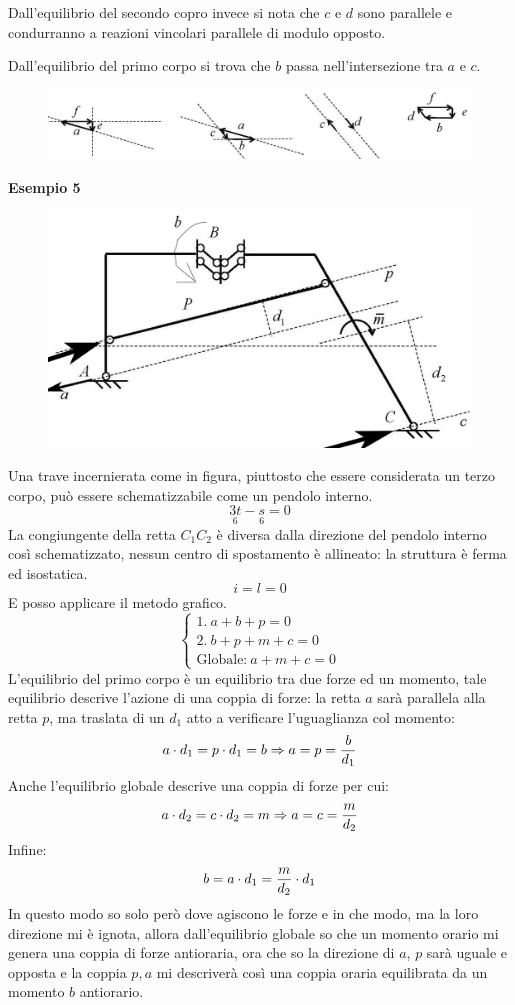 \documentclass{article}
\begin{document}
\begin{adjustwidth}{2in}{}
Dall'equilibrio del secondo copro invece si nota che $c$ e $d$ sono parallele e condurranno a reazioni vincolari parallele di modulo opposto. 

Dall'equilibrio del primo corpo si trova che $b$ passa nell'intersezione tra $a$ e $c$. 

\begin{figure}[H]
	\centering
	\includegraphics[width=0.6\linewidth]{immagini/1.PARTE4_Pagina_33}
\end{figure}
\newpage
\textbf{Esempio 5} \newline
\begin{figure}[H]
	\centering
	\includegraphics[width=0.5\linewidth]{immagini/1.PARTE4_Pagina_34}
\end{figure}
Una trave incernierata come in figura, piuttosto che essere considerata un terzo corpo, può essere schematizzabile come un pendolo interno.
\[\underset{6}{3t} - \underset{6}{s} = 0\]
La congiungente della retta $C_1C_2$ è diversa dalla direzione del pendolo interno così schematizzato, nessun centro di spostamento è allineato: la struttura è ferma ed isostatica. 
\[i=l=0\]
E posso applicare il metodo grafico. 
\[\begin{cases}
	1. ~ a + b+ p = 0\\
	2. ~ b+ p + m +c  = 0 \\
	\text{Globale:} ~ a + m + c = 0
\end{cases}\]
L'equilibrio del primo corpo è un equilibrio tra due forze ed un momento, tale equilibrio descrive l'azione di una coppia di forze: la retta $a$ sarà parallela alla retta $p$, ma traslata di un $d_1$ atto a verificare l'uguaglianza col momento:
\[a\cdot d_1 = p\cdot d_1 = b \Rightarrow a = p = {b\over d_1}\]
Anche l'equilibrio globale descrive una coppia di forze per cui:
\[a\cdot d_2 = c\cdot d_2 = m \Rightarrow a = c = {m\over d_2} \]
Infine: 
\[ b = a\cdot d_1 =  {m\over d_2}\cdot d_1 \]
In questo modo so solo però dove agiscono le forze e in che modo, ma la loro direzione mi è ignota, allora dall'equilibrio globale so che un momento orario mi genera una coppia di forze antioraria, ora che so la direzione di $a$, $p$ sarà uguale e opposta e la coppia $p,a$ mi descriverà così una coppia oraria equilibrata da un momento $b$ antiorario. 
\newpage


\end{adjustwidth}
\end{document}
